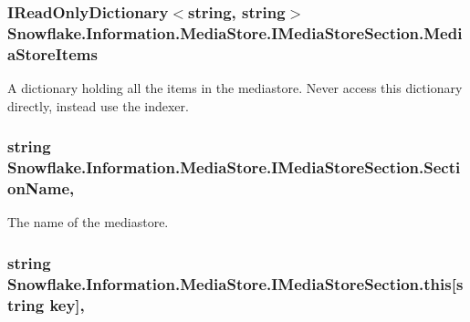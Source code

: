 \subsubsection[{Media\+Store\+Items}]{\setlength{\rightskip}{0pt plus 5cm}I\+Read\+Only\+Dictionary$<$string, string$>$ Snowflake.\+Information.\+Media\+Store.\+I\+Media\+Store\+Section.\+Media\+Store\+Items\hspace{0.3cm}{\ttfamily [get]}}\label{interface_snowflake_1_1_information_1_1_media_store_1_1_i_media_store_section_ad756842e38469738145eec216952c9b5}


A dictionary holding all the items in the mediastore. Never access this dictionary directly, instead use the indexer. 

\hypertarget{interface_snowflake_1_1_information_1_1_media_store_1_1_i_media_store_section_ab0d70ad45cbbb8aadf5cd992e6d274d4}{}
\subsubsection[{Section\+Name}]{\setlength{\rightskip}{0pt plus 5cm}string Snowflake.\+Information.\+Media\+Store.\+I\+Media\+Store\+Section.\+Section\+Name\hspace{0.3cm}{\ttfamily [get]}, {\ttfamily [set]}}\label{interface_snowflake_1_1_information_1_1_media_store_1_1_i_media_store_section_ab0d70ad45cbbb8aadf5cd992e6d274d4}


The name of the mediastore. 

\hypertarget{interface_snowflake_1_1_information_1_1_media_store_1_1_i_media_store_section_ad878b6801659f539a1482b12e09468f6}{}
\subsubsection[{this[string key]}]{\setlength{\rightskip}{0pt plus 5cm}string Snowflake.\+Information.\+Media\+Store.\+I\+Media\+Store\+Section.\+this\mbox{[}string key\mbox{]}\hspace{0.3cm}{\ttfamily [get]}, {\ttfamily [set]}}\label{interface_snowflake_1_1_information_1_1_media_store_1_1_i_media_store_section_ad878b6801659f539a1482b12e09468f6}


